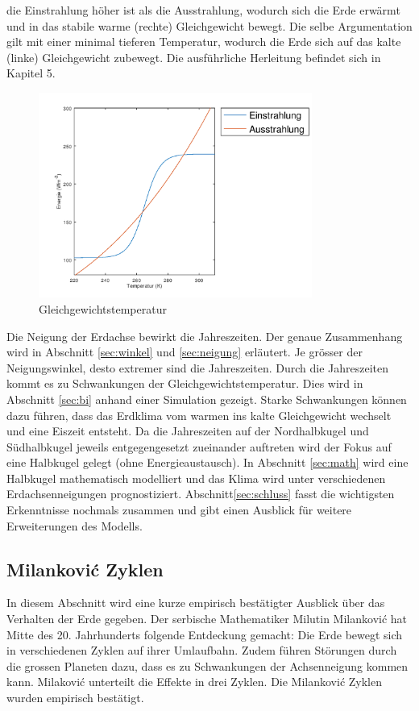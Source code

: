 \begin{refsection}
die Einstrahlung höher ist als die Ausstrahlung, wodurch sich die
Erde erwärmt und in das stabile warme (rechte) Gleichgewicht bewegt.
Die selbe Argumentation gilt mit einer minimal tieferen Temperatur,
wodurch die Erde sich auf das kalte (linke) Gleichgewicht zubewegt.
Die ausführliche Herleitung befindet sich in Kapitel 5.
%
\begin{figure}
	\centering
	\includegraphics[width= 0.8\textwidth]{neigung/Strahlung_1.png}
	\caption[Gleichgewichtstemperatur]{Gleichgewichtstemperatur}
	\label{fig:abb1}
\end{figure}

Die Neigung der Erdachse bewirkt die Jahreszeiten. Der genaue
Zusammenhang wird in Abschnitt \ref{sec:winkel} und \ref{sec:neigung}
erläutert. Je grösser der Neigungswinkel, desto extremer sind die
Jahreszeiten. Durch die Jahreszeiten kommt es zu Schwankungen der
Gleichgewichtstemperatur. Dies wird in Abschnitt \ref{sec:bi} anhand
einer Simulation gezeigt. Starke Schwankungen können dazu führen,
dass das Erdklima vom warmen ins kalte Gleichgewicht wechselt und
eine Eiszeit entsteht. Da die Jahreszeiten auf der Nordhalbkugel
und Südhalbkugel jeweils entgegengesetzt zueinander auftreten wird
der Fokus auf eine Halbkugel gelegt (ohne Energieaustausch). In
Abschnitt \ref{sec:math} wird eine Halbkugel mathematisch modelliert
und das Klima wird unter verschiedenen Erdachsenneigungen prognostiziert.
Abschnitt\ref{sec:schluss} fasst die wichtigsten Erkenntnisse
nochmals zusammen und gibt einen Ausblick für weitere Erweiterungen
des Modells.

\subsection{Milankovi\'c Zyklen}\label{sec:mil}
In diesem Abschnitt wird eine kurze empirisch bestätigter Ausblick
über das Verhalten der Erde gegeben. Der serbische Mathematiker
Milutin Milankovi\'c hat Mitte des 20. Jahrhunderts folgende
Entdeckung gemacht: Die Erde bewegt sich in verschiedenen Zyklen
auf ihrer Umlaufbahn.
Zudem führen Störungen durch die grossen Planeten dazu, dass es zu
Schwankungen der Achsenneigung kommen kann. Milakovi\'c unterteilt
die Effekte in drei Zyklen. Die Milankovi\'c Zyklen wurden empirisch
bestätigt.


\end{refsection}
